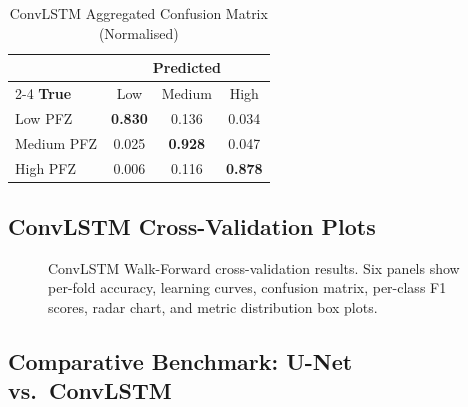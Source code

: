 \documentclass[conference]{IEEEtran}
\begin{document}
\begin{table}[htbp]
\caption{ConvLSTM Aggregated Confusion Matrix (Normalised)}
\label{tab:lstm_cm}
\centering
\begin{tabular}{lccc}
\toprule
& \multicolumn{3}{c}{\textbf{Predicted}} \\
\cmidrule(lr){2-4}
\textbf{True} & Low & Medium & High\\
\midrule
Low PFZ    & \textbf{0.830} & 0.136 & 0.034\\
Medium PFZ & 0.025 & \textbf{0.928} & 0.047\\
High PFZ   & 0.006 & 0.116 & \textbf{0.878}\\
\bottomrule
\end{tabular}
\end{table}

\subsection{ConvLSTM Cross-Validation Plots}

\begin{figure}[htbp]
\centering
\caption{ConvLSTM Walk-Forward cross-validation results. Six panels
show per-fold accuracy, learning curves, confusion matrix, per-class
F1 scores, radar chart, and metric distribution box plots.}
\label{fig:convlstm_cv_plots}
\end{figure}

\subsection{Comparative Benchmark: U-Net vs.\ ConvLSTM}
\end{document}
